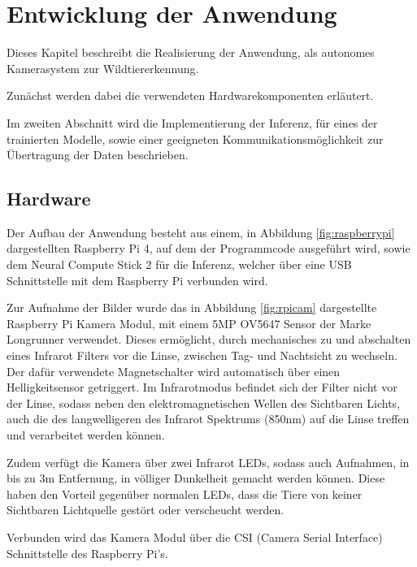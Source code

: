 
\chapter{Entwicklung der Anwendung}\label{kap:application}


Dieses Kapitel beschreibt die Realisierung der
Anwendung, als autonomes Kamerasystem zur
Wildtiererkennung.

Zunächst werden dabei die verwendeten Hardwarekomponenten 
erläutert.

Im zweiten Abschnitt wird die Implementierung der 
Inferenz, für eines der trainierten Modelle, 
sowie einer geeigneten Kommunikationsmöglichkeit 
zur Übertragung der Daten beschrieben.


\section{Hardware}\label{sec:aufbau}


Der Aufbau der Anwendung besteht aus einem, in Abbildung 
\ref{fig:raspberrypi} dargestellten Raspberry Pi 4,
auf dem der Programmcode ausgeführt wird,
sowie dem Neural Compute Stick 2 für die Inferenz,
welcher über eine USB Schnittstelle
mit dem Raspberry Pi verbunden wird.

Zur Aufnahme der Bilder wurde das in 
Abbildung \ref{fig:rpicam} dargestellte 
Raspberry Pi Kamera Modul,
mit einem 5MP OV5647 Sensor der Marke Longrunner
verwendet.
Dieses ermöglicht, durch mechanisches zu und abschalten
eines Infrarot Filters vor die Linse, zwischen Tag- und
Nachtsicht zu wechseln.
Der dafür verwendete Magnetschalter wird automatisch 
über einen Helligkeitsensor getriggert.
Im Infrarotmodus befindet sich der Filter nicht 
vor der Linse, sodass neben den elektromagnetischen 
Wellen des Sichtbaren Lichts, auch die des 
langwelligeren des Infrarot Spektrums (850nm) 
auf die Linse treffen und verarbeitet werden können.

Zudem verfügt die Kamera über zwei Infrarot LEDs, 
sodass auch Aufnahmen, in bis zu 3m Entfernung,
in völliger Dunkelheit gemacht werden können.
Diese haben den Vorteil gegenüber normalen LEDs, 
dass die Tiere von keiner Sichtbaren Lichtquelle 
gestört oder verscheucht werden.

Verbunden wird das Kamera Modul über die CSI 
(Camera Serial Interface) 
Schnittstelle des Raspberry Pi's.

